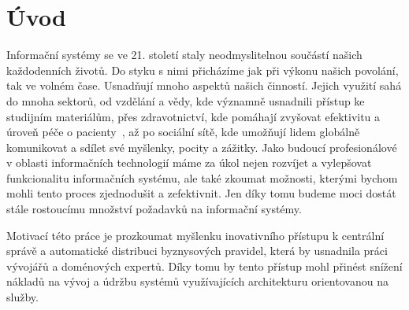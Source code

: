 

\chapter{Úvod}\label{ch:uvod}



Informační systémy se ve 21. století staly neodmyslitelnou součástí našich každodenních životů.
Do styku s nimi přicházíme jak při výkonu našich povolání, tak ve volném čase. Usnadňují
mnoho aspektů našich činností. Jejich využití sahá do mnoha sektorů, od vzdělání a vědy,
kde významně usnadnili přístup ke studijním materiálům, přes zdravotnictví,
kde pomáhají zvyšovat efektivitu a úroveň péče o pacienty~\cite{fichman2011editorial}, až po
sociální sítě, kde umožňují lidem globálně komunikovat a sdílet své myšlenky, pocity a zážitky.
Jako budoucí profesionálové v oblasti informačních technologií máme za úkol nejen
rozvíjet a vylepšovat funkcionalitu informačních systému, ale také zkoumat možnosti, kterými
bychom mohli tento proces zjednodušit a zefektivnit. Jen díky tomu budeme moci dostát stále
rostoucímu množství požadavků na informační systémy.








Motivací této práce je prozkoumat myšlenku inovativního přístupu k centrální správě a automatické
distribuci byznysových pravidel, která by usnadnila práci vývojářů a doménových expertů. Díky tomu
by tento přístup mohl přinést snížení nákladů na vývoj a údržbu systémů využívajících architekturu
orientovanou na služby.

